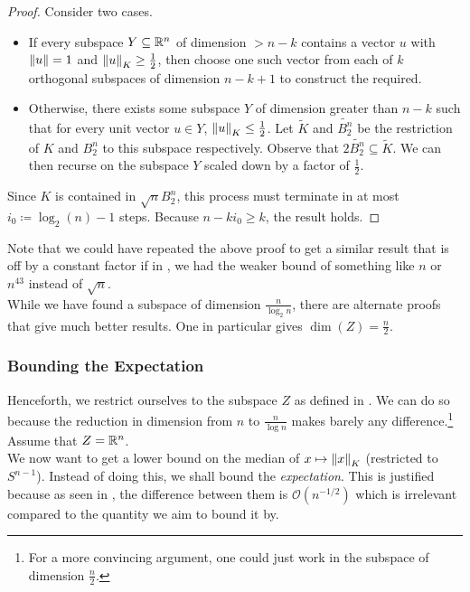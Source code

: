 \begin{proof}
Consider two cases.
\begin{itemize}
    \item If every subspace $Y\subseteq\mathbb{R}^n$ of dimension $>n-k$ contains a vector $u$ with $\left\lVert u\right\rVert=1$ and $\left\lVert u\right\rVert_{K}\geq\frac{1}{2}$, then choose one such vector from each of $k$ orthogonal subspaces of dimension $n-k+1$ to construct the required.
    \item Otherwise, there exists some subspace $Y$ of dimension greater than $n-k$ such that for every unit vector $u\in Y$, $\left\lVert u\right\rVert_K \leq \frac{1}{2}$. Let $\tilde{K}$ and $\tilde{B_2^n}$ be the restriction of $K$ and $B_2^n$ to this subspace respectively. Observe that $2\tilde{B_2^n}\subseteq\tilde{K}$. We can then recurse on the subspace $Y$ scaled down by a factor of $\frac{1}{2}$.
\end{itemize}
Since $K$ is contained in $\sqrt{n}B_2^n$, this process must terminate in at most $i_0\coloneqq\log_2(n)-1$ steps. Because $n-ki_0\geq k$, the result holds.
\end{proof}

Note that we could have repeated the above proof to get a similar result that is off by a constant factor if in , we had the weaker bound of something like $n$ or $n^{43}$ instead of $\sqrt{n}$.\\

While we have found a subspace of dimension $\frac{n}{\log_2 n}$, there are alternate proofs that give much better results. One in particular gives $\dim(Z) = \frac{n}{2}$.

\subsubsection{Bounding the Expectation}
\label{bounding expectation}

Henceforth, we restrict ourselves to the subspace $Z$ as defined in . We can do so because the reduction in dimension from $n$ to $\frac{n}{\log n}$ makes barely any difference.\footnote{For a more convincing argument, one could just work in the subspace of dimension $\frac{n}{2}$.} Assume that $Z=\mathbb{R}^n$. \\

We now want to get a lower bound on the median of $x\mapsto\left\lVert x\right\rVert_K$ (restricted to $S^{n-1}$). Instead of doing this, we shall bound the \textit{expectation}. This is justified because as seen in , the difference between them is $\mathcal{O}(n^{-1/2})$ which is irrelevant compared to the quantity we aim to bound it by.\\


